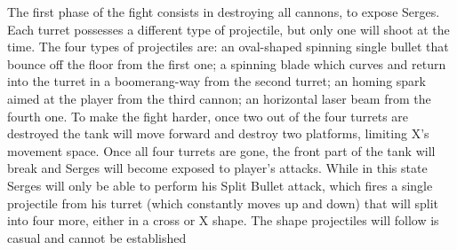 The first phase of the fight consists in destroying all cannons, to expose Serges. Each turret possesses a different type of projectile, but only one will shoot at the time. The four types of projectiles are: an oval-shaped spinning single bullet that bounce off the floor from the first one; a spinning blade which curves and return into the turret in a boomerang-way from the second turret; an homing spark aimed at the player from the third cannon; an horizontal laser beam from the fourth one. To make the fight harder, once two out of the four turrets are destroyed the tank will move forward and destroy two platforms, limiting X's movement space. Once all four turrets are gone, the front part of the tank will break and Serges will become exposed to player's attacks. While in this state Serges will only be able to perform his Split Bullet attack, which fires a single projectile from his turret (which constantly moves up and down) that will split into four more, either in a cross or X shape. The shape projectiles will follow is casual and cannot be established

